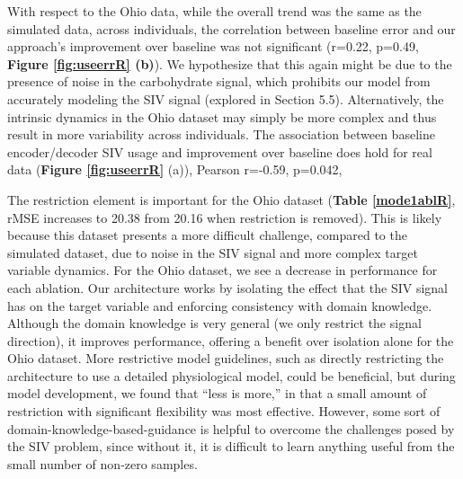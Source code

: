 \documentclass[letterpaper]{article}
\begin{document}
With respect to the Ohio data, while the overall trend was the same as the simulated data, across individuals, the correlation between baseline error and our approach's improvement over baseline was not significant (r=0.22, p=0.49,  \textbf{Figure \ref{fig:useerrR} (b)}). We hypothesize that this again might be due to the presence of noise in the carbohydrate signal, which prohibits our model from accurately modeling the SIV signal (explored in Section 5.5). Alternatively, the intrinsic dynamics in the Ohio dataset may simply be more complex and thus result in more variability across individuals.  The association between baseline encoder/decoder SIV usage and improvement over baseline does hold for real data (\textbf{Figure \ref{fig:useerrR}} (a)), Pearson r=-0.59, p=0.042, 





The restriction element is important for the Ohio dataset (\textbf{Table \ref{mode1ablR}}, rMSE increases to 20.38 from 20.16 when restriction is removed). This is likely because this dataset presents a more difficult challenge, compared to the simulated dataset, due to noise in the SIV signal and more complex target variable dynamics. For the Ohio dataset, we see a decrease in performance for each ablation. Our architecture works by isolating the effect that the SIV signal has on the target variable and enforcing consistency with domain knowledge. Although the domain knowledge is very general (we only restrict the signal direction), it improves performance, offering a benefit over isolation alone for the Ohio dataset. More restrictive model guidelines, such as directly restricting the architecture to use a detailed physiological model, could be beneficial, but during model development, we found that ``less is more,'' in that a small amount of restriction with significant flexibility was most effective. However, some sort of domain-knowledge-based-guidance is helpful to overcome the challenges posed by the SIV problem, since without it, it is difficult to learn anything useful from the small number of non-zero samples.
\end{document}
